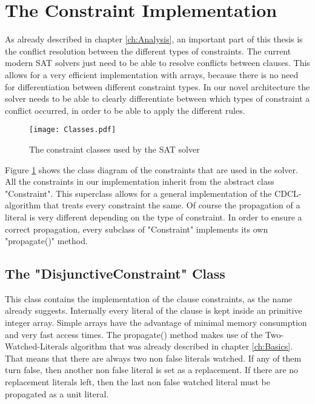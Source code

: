 \section{The Constraint Implementation}

As already described in chapter \ref{ch:Analysis}, an important part of this thesis is the conflict resolution between the different types of constraints. The current modern SAT solvers just need to be able to resolve conflicts between clauses. This allows for a very efficient implementation with arrays, because there is no need for differentiation between different constraint types. In our novel architecture the solver needs to be able to clearly differentiate between which types of constraint a conflict occurred, in order to be able to apply the different rules.

\begin{figure}[htbp]
  \centering
  \texttt{[image: Classes.pdf]}
  \caption{The constraint classes used by the SAT solver}
  \label{fig:constraints}
\end{figure}

Figure \ref{fig:constraints} shows the class diagram of the constraints that are used in the solver. All the constraints in our implementation inherit from the abstract class "Constraint". This superclass allows for a general implementation of the CDCL-algorithm that treats every constraint the same. Of course the propagation of a literal is very different depending on the type of constraint. In order to ensure a correct propagation, every subclass of "Constraint" implements its own "propagate()" method.

\subsection{The "DisjunctiveConstraint" Class}

This class contains the implementation of the clause constraints, as the name already suggests. Internally every literal of the clause is kept inside an primitive integer array. Simple arrays have the advantage of minimal memory consumption and very fast access times. The propagate() method makes use of the Two-Watched-Literals algorithm that was already described in chapter \ref{ch:Basics}. That means that there are always two non false literals watched. If any of them turn false, then another non false literal is set as a replacement. If there are no replacement literals left, then the last non false watched literal must be propagated as a unit literal.

